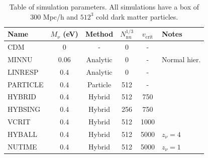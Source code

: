 \documentclass[useAMS, usenatbib]{mnras}
\begin{document}
\begin{table}
\begin{center}
\begin{tabular}{|l|c|c|c|c|l|}
\hline
    Name & $M_\nu$ (eV) & Method & $N_\mathrm{nu}^{1/3}$ & $v_\mathrm{crit}$ & Notes \\
\hline
CDM    &       0             &    -          & 0         & - &    \\
MINNU    &     0.06            &   Analytic    & 0         & - &  Normal hier.  \\
LINRESP    &     0.4             &   Analytic    & 0         & - &    \\
PARTICLE    &     0.4             &   Particle    & 512       & - &    \\
HYBRID    &     0.4             &   Hybrid      & 512       & 750 & \\
HYBSING    &     0.4             &   Hybrid      & 256       & 750 & \\
VCRIT    &     0.4             &   Hybrid      & 512       & 1000 & \\
HYBALL    &     0.4             &   Hybrid      & 512       & 5000 & $z_\nu = 4$ \\
NUTIME    &     0.4             &   Hybrid      & 512       & 5000 & $z_\nu = 1$  \\

\hline
\end{tabular}
\end{center}
\caption{Table of simulation parameters. All simulations have a box of $300$ Mpc/h
and $512^3$ cold dark matter particles.
}
\label{tab:simulations}
\end{table}
\end{document}
